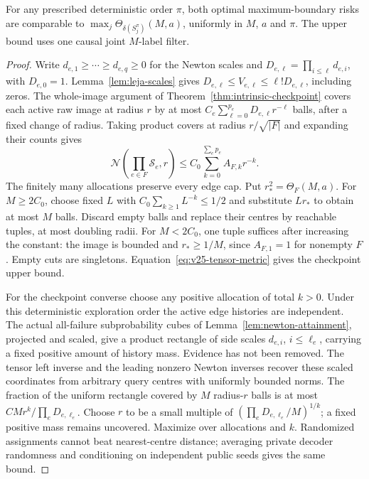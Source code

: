 \begin{proposition}\label{prop:v25-fixed-order}
For any prescribed deterministic order $\pi$, both optimal
maximum-boundary risks are comparable to
$\max_j\Theta_{\delta(S_j^\pi)}(M,a)$, uniformly in $M$, $a$ and
$\pi$. The upper bound uses one causal joint $M$-label filter.
\end{proposition}
\begin{proof}
Write $d_{e,1}\ge\cdots\ge d_{e,q}\ge0$ for the Newton scales and
$D_{e,\ell}=\prod_{i\le\ell}d_{e,i}$, with $D_{e,0}=1$.
Lemma~\ref{lem:leja-scales} gives
$D_{e,\ell}\le V_{e,\ell}\le\ell!D_{e,\ell}$, including zeros.
The whole-image argument of Theorem~\ref{thm:intrinsic-checkpoint}
covers each active raw image at radius $r$ by at most
$C_e\sum_{\ell=0}^{p_e}D_{e,\ell}r^{-\ell}$ balls, after a fixed
change of radius. Taking product covers at radius $r/\sqrt{|F|}$
and expanding their counts gives
\begin{equation}\label{eq:v25-product-cover}
 \mathcal N\left(\prod_{e\in F}\mathcal S_e,r\right)
      \le C_0\sum_{k=0}^{\sum_ep_e} A_{F,k}r^{-k}.
\end{equation}
The finitely many allocations preserve every edge cap. Put
$r_*^2=\Theta_F(M,a)$. For $M\ge2C_0$, choose fixed $L$ with
$C_0\sum_{k\ge1}L^{-k}\le1/2$ and substitute $Lr_*$ to obtain at
most $M$ balls. Discard empty balls and replace their centres by
reachable tuples, at most doubling radii. For $M<2C_0$, one tuple
suffices after increasing the constant: the image is bounded and
$r_*\ge1/M$, since $A_{F,1}=1$ for nonempty $F$. Empty cuts are
singletons. Equation~\eqref{eq:v25-tensor-metric} gives the checkpoint
upper bound.

For the checkpoint converse choose any positive allocation of total
$k>0$. Under this deterministic exploration order the active edge
histories are independent. The actual all-failure subprobability cubes
of Lemma~\ref{lem:newton-attainment}, projected and scaled, give a
product rectangle of side scales $d_{e,i}$, $i\le\ell_e$, carrying a
fixed positive amount of history mass. Evidence has not been removed.
The tensor left inverse and the leading nonzero Newton inverses recover
these scaled coordinates from arbitrary query centres with uniformly
bounded norms. The fraction of the uniform rectangle covered by $M$
radius-$r$ balls is at most $CMr^k/\prod_eD_{e,\ell_e}$. Choose $r$
to be a small multiple of
$(\prod_eD_{e,\ell_e}/M)^{1/k}$; a fixed positive mass remains
uncovered. Maximize over allocations and $k$. Randomized assignments
cannot beat nearest-centre distance; averaging private decoder
randomness and conditioning on independent public seeds gives the same
bound.


\end{proof}
